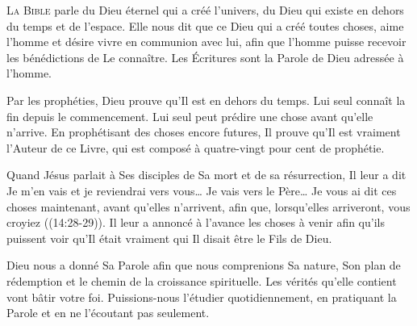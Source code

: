 


\lettrine{L}{a Bible} parle du Dieu éternel qui a créé l'univers,
 du Dieu qui existe en dehors du temps et de l'espace.
 Elle nous dit que ce Dieu qui a créé toutes choses,
 aime l'homme et désire vivre en communion avec lui,
 afin que l'homme puisse recevoir les bénédictions de Le connaître.
 Les Écritures sont la Parole de Dieu adressée à l'homme.


Par les prophéties, Dieu prouve qu'Il est en dehors du temps.
 Lui seul connaît la fin depuis le commencement.
 Lui seul peut prédire une chose avant qu'elle n'arrive.
 En prophétisant des choses encore futures, Il prouve qu'Il est vraiment
 l'Auteur de ce Livre, qui est composé à quatre-vingt pour cent de prophétie. 

Quand Jésus parlait à Ses disciples de Sa mort et de sa résurrection,
 Il leur a dit\frcolon {}
 \Og Je m'en vais et je reviendrai vers vous\dots{}
 Je vais vers le Père\dots{} Je vous ai dit ces choses maintenant,
 avant qu'elles n'arrivent, afin que, lorsqu'elles arriveront,
 vous croyiez \Fg{} ((14:28-29)).
 Il leur a annoncé à l'avance les choses à venir afin qu'ils puissent
 voir qu'Il était vraiment qui Il disait être \ocadr le Fils de Dieu. 

Dieu nous a donné Sa Parole afin que nous comprenions Sa nature,
 Son plan de rédemption et le chemin de la croissance spirituelle.
 Les vérités qu'elle contient vont bâtir votre foi.
 Puissions-nous l'étudier quotidiennement, en pratiquant la Parole
 et en ne l'écoutant pas seulement.

\dvrule






